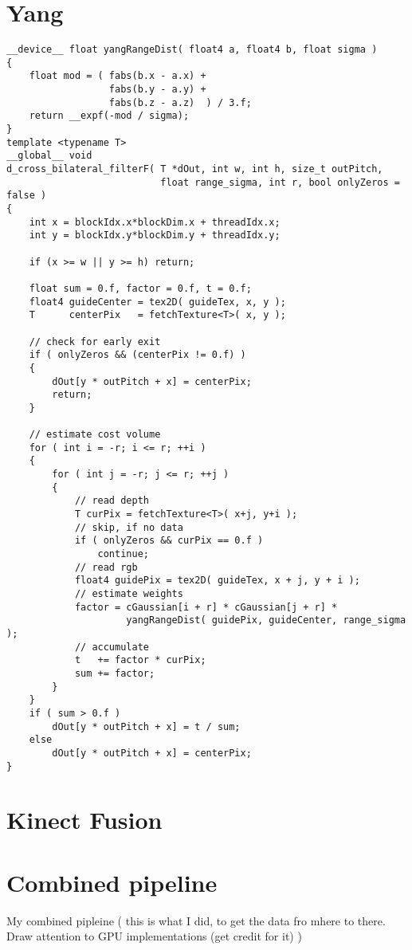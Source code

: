 \documentclass{ucl_thesis}
\begin{document}
\section{Yang}

\lstset{style=customcpp}
\begin{lstlisting}
__device__ float yangRangeDist( float4 a, float4 b, float sigma )
{
    float mod = ( fabs(b.x - a.x) +
                  fabs(b.y - a.y) +
                  fabs(b.z - a.z)  ) / 3.f;
    return __expf(-mod / sigma);
}
template <typename T>
__global__ void
d_cross_bilateral_filterF( T *dOut, int w, int h, size_t outPitch,
                           float range_sigma, int r, bool onlyZeros = false )
{
    int x = blockIdx.x*blockDim.x + threadIdx.x;
    int y = blockIdx.y*blockDim.y + threadIdx.y;

    if (x >= w || y >= h) return;

    float sum = 0.f, factor = 0.f, t = 0.f;
    float4 guideCenter = tex2D( guideTex, x, y );
    T      centerPix   = fetchTexture<T>( x, y );

    // check for early exit
    if ( onlyZeros && (centerPix != 0.f) )
    {
        dOut[y * outPitch + x] = centerPix;
        return;
    }

    // estimate cost volume
    for ( int i = -r; i <= r; ++i )
    {
        for ( int j = -r; j <= r; ++j )
        {
            // read depth
            T curPix = fetchTexture<T>( x+j, y+i );
            // skip, if no data
            if ( onlyZeros && curPix == 0.f )
                continue;
            // read rgb
            float4 guidePix = tex2D( guideTex, x + j, y + i );
            // estimate weights
            factor = cGaussian[i + r] * cGaussian[j + r] *
                     yangRangeDist( guidePix, guideCenter, range_sigma );
            // accumulate
            t   += factor * curPix;
            sum += factor;
        }
    }
    if ( sum > 0.f )
        dOut[y * outPitch + x] = t / sum;
    else
        dOut[y * outPitch + x] = centerPix;
}

\end{lstlisting}

\section{Kinect Fusion}

\section{Combined pipeline}
My combined pipleine ( this is what I did, to get the data fro mhere to there. Draw attention to GPU implementations (get credit for it) )
\end{document}
